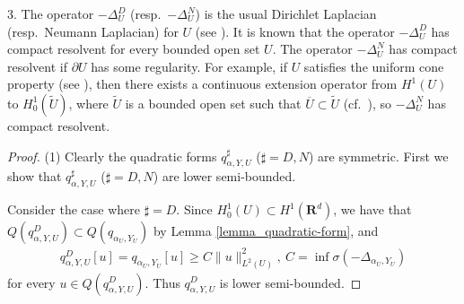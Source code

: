 \documentclass[12pt,a4paper]{article}
\begin{document}
3. The operator $-\Delta^D_U$ (resp.\ $-\Delta^N_U$)
is the usual Dirichlet Laplacian 
(resp.\ Neumann Laplacian) for $U$ (see \cite[section XIII.15]{Re-Si4}).
It is known that 
the operator $-\Delta^D_{U}$
has compact resolvent for every bounded open set $U$.
The operator
$-\Delta^N_{U}$
has compact resolvent
if $\partial U$  
has some regularity.
For example, if 
$U$ satisfies the uniform cone property (see \cite[Definition 2.3]{Wl}),
then there exists a continuous extension operator
from $H^1(U)$ to $H^1_0(\widetilde{U})$,
where $\widetilde{U}$ is a bounded open set such that 
$\overline{U}\subset \widetilde{U}$
(cf.\ \cite[Theorem 5.4]{Wl}),
so $-\Delta^N_{U}$ has compact resolvent.


\begin{proof}
(1) 
Clearly
the quadratic forms
$q^\sharp_{\alpha,Y,U}$ ($\sharp=D,N$) are symmetric.
First we show that 
$q^\sharp_{\alpha,Y,U}$ ($\sharp=D,N$) are lower semi-bounded.

Consider the case where $\sharp=D$.
Since $H^1_0(U)\subset H^1(\mathbf{R}^d)$,
we have that 
$Q(q^D_{\alpha,Y,U})\subset Q(q_{\alpha_U,Y_U})$ 
by Lemma \ref{lemma_quadratic-form}, and
\begin{align}
 q^D_{\alpha,Y,U}[u]
=
q_{\alpha_U,Y_U}[u]
\geq C\|u\|^2_{L^2(U)},\ 
C=\inf\sigma(-\Delta_{\alpha_U,Y_U})
\label{06_16}
\end{align}
for every $u\in Q(q^D_{\alpha,Y,U})$.
Thus $q^D_{\alpha,Y,U}$ is lower semi-bounded.


\end{proof}
\end{document}
